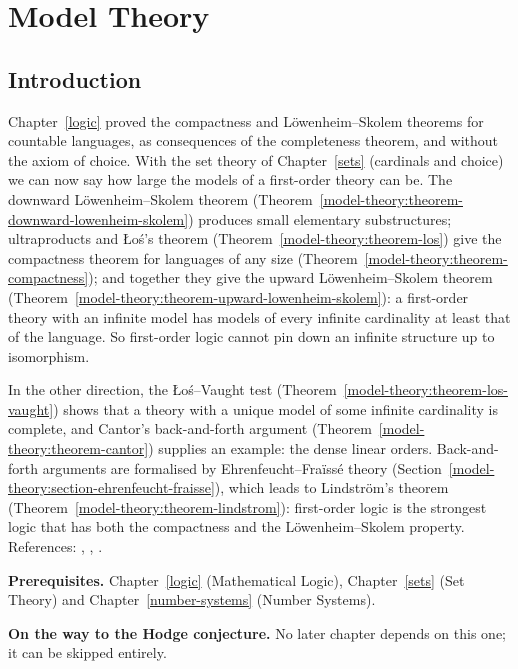 \chapter{Model Theory}\label{model-theory}

\section{Introduction}\label{model-theory:section-introduction}

Chapter~\ref{logic} proved the compactness and L\"owenheim--Skolem theorems for countable languages, as consequences of the completeness theorem, and
without the axiom of choice. With the set theory of Chapter~\ref{sets} (cardinals and choice) we can now say how large the models of a first-order
theory can be. The downward L\"owenheim--Skolem theorem (Theorem~\ref{model-theory:theorem-downward-lowenheim-skolem}) produces small elementary
substructures; ultraproducts and Łoś's theorem (Theorem~\ref{model-theory:theorem-los}) give the compactness theorem for languages of any size
(Theorem~\ref{model-theory:theorem-compactness}); and together they give the upward L\"owenheim--Skolem theorem
(Theorem~\ref{model-theory:theorem-upward-lowenheim-skolem}): a first-order theory with an infinite model has models of every infinite cardinality at
least that of the language. So first-order logic cannot pin down an infinite structure up to isomorphism.

In the other direction, the Łoś--Vaught test (Theorem~\ref{model-theory:theorem-los-vaught}) shows that a theory with a unique model of some
infinite cardinality is complete, and Cantor's back-and-forth argument (Theorem~\ref{model-theory:theorem-cantor}) supplies an example: the dense linear
orders. Back-and-forth arguments are formalised by Ehrenfeucht--Fra\"iss\'e theory (Section~\ref{model-theory:section-ehrenfeucht-fraisse}), which
leads to Lindstr\"om's theorem (Theorem~\ref{model-theory:theorem-lindstrom}): first-order logic is the strongest logic that has both the compactness
and the L\"owenheim--Skolem property. References: \cite{chang-keisler}, \cite{marker-model-theory}, \cite[Chapters XII and XIII]{ebbinghaus-flum-thomas}.

\noindent\textbf{Prerequisites.} Chapter~\ref{logic} (Mathematical Logic), Chapter~\ref{sets} (Set Theory) and Chapter~\ref{number-systems} (Number
Systems).

\noindent\textbf{On the way to the Hodge conjecture.} No later chapter depends on this one; it can be skipped entirely.

